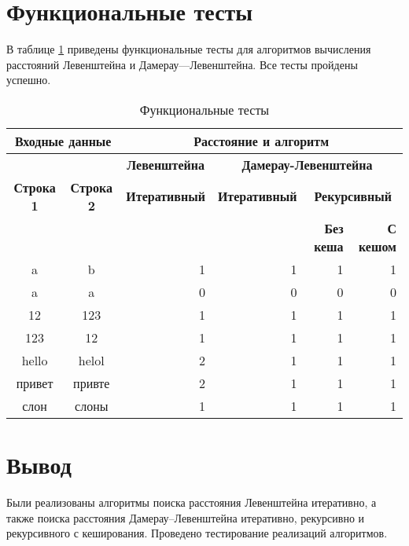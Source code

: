 \clearpage

\section{Функциональные тесты}

В таблице \ref{tbl:func_tests} приведены функциональные тесты для алгоритмов вычисления расстояний Левенштейна и Дамерау—Левенштейна.
Все тесты пройдены успешно.

\begin{table}[ht]
	\small
	\begin{center}
		\begin{threeparttable}
		\caption{Функциональные тесты}
		\label{tbl:func_tests}
		\begin{tabular}{|c|c|r|r|r|r|}
			\hline
			\multicolumn{2}{|c|}{\bfseries Входные данные}
			& \multicolumn{4}{c|}{\bfseries Расстояние и алгоритм} \\
			\hline
			&
			& \multicolumn{1}{c|}{\bfseries Левенштейна}
			& \multicolumn{3}{c|}{\bfseries Дамерау-Левенштейна} \\ \cline{3-6}

			\bfseries Строка 1 & \bfseries Строка 2 & \bfseries Итеративный & \bfseries Итеративный

			& \multicolumn{2}{c|}{\bfseries Рекурсивный} \\ \cline{5-6}
			& & & & \bfseries Без кеша & \bfseries С кешом \\
			\hline
			a & b & 1 & 1 & 1 & 1 \\
			\hline
			a & a & 0 & 0 & 0 & 0 \\
			\hline
			12 & 123 & 1 & 1 & 1 & 1 \\
			\hline
			123 & 12 & 1 & 1 & 1 & 1 \\
			\hline
			hello & helol & 2 & 1 & 1 & 1 \\
			\hline
			привет & привте & 2 & 1 & 1 & 1 \\
			\hline
			слон & слоны & 1 & 1 & 1 & 1 \\
			\hline
		\end{tabular}
		\end{threeparttable}
	\end{center}
\end{table}

\section*{Вывод}

Были реализованы алгоритмы поиска расстояния Левенштейна итеративно, а также поиска расстояния Дамерау–Левенштейна итеративно, рекурсивно и рекурсивного с кеширования.
Проведено тестирование реализаций алгоритмов.
